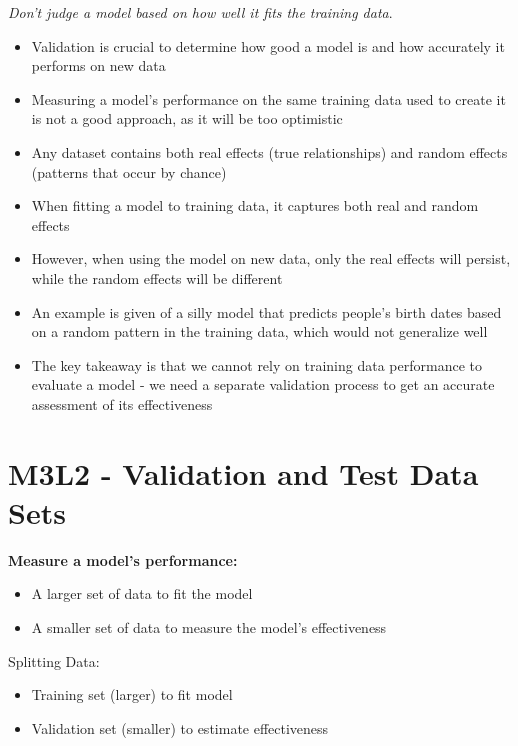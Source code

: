 \documentclass[
]{book}
\providecommand{\tightlist}{%
  \setlength{\itemsep}{0pt}\setlength{\parskip}{0pt}}
\begin{document}
\emph{Don't judge a model based on how well it fits the training data}.

\begin{itemize}
\tightlist
\item
  Validation is crucial to determine how good a model is and how accurately it performs on new data
\item
  Measuring a model's performance on the same training data used to create it is not a good approach, as it will be too optimistic
\item
  Any dataset contains both real effects (true relationships) and random effects (patterns that occur by chance)
\item
  When fitting a model to training data, it captures both real and random effects
\item
  However, when using the model on new data, only the real effects will persist, while the random effects will be different
\item
  An example is given of a silly model that predicts people's birth dates based on a random pattern in the training data, which would not generalize well
\item
  The key takeaway is that we cannot rely on training data performance to evaluate a model - we need a separate validation process to get an accurate assessment of its effectiveness
\end{itemize}

\section{M3L2 - Validation and Test Data Sets}\label{m3l2---validation-and-test-data-sets}

\textbf{Measure a model's performance:}

\begin{itemize}
\tightlist
\item
  A larger set of data to fit the model
\item
  A smaller set of data to measure the model's effectiveness
\end{itemize}

Splitting Data:

\begin{itemize}
\tightlist
\item
  Training set (larger) to fit model
\item
  Validation set (smaller) to estimate effectiveness
\end{itemize}
\end{document}
